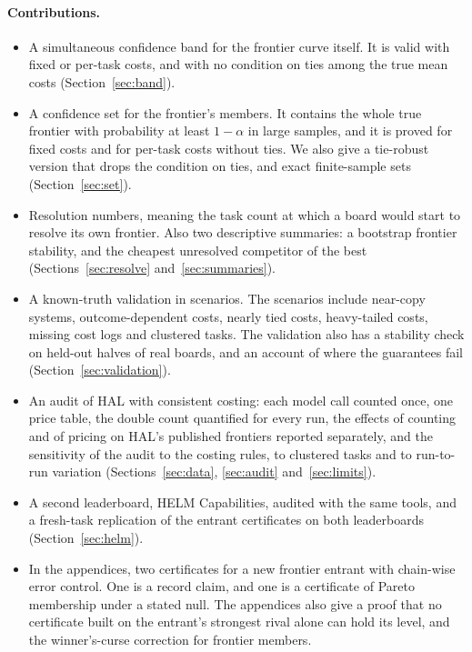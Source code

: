 \documentclass[11pt]{article}
\begin{document}
\paragraph{Contributions.}
\begin{itemize}
\item A simultaneous confidence band for the frontier curve itself. It is valid with fixed or per-task costs, and with no condition on ties among the true mean costs (Section~\ref{sec:band}).
\item A confidence set for the frontier's members. It contains the whole true frontier with probability at least $1-\alpha$ in large samples, and it is proved for fixed costs and for per-task costs without ties. We also give a tie-robust version that drops the condition on ties, and exact finite-sample sets (Section~\ref{sec:set}).
\item Resolution numbers, meaning the task count at which a board would start to resolve its own frontier. Also two descriptive summaries: a bootstrap frontier stability, and the cheapest unresolved competitor of the best (Sections~\ref{sec:resolve} and~\ref{sec:summaries}).
\item A known-truth validation in \NumValScenarios{} scenarios. The scenarios include near-copy systems, outcome-dependent costs, nearly tied costs, heavy-tailed costs, missing cost logs and clustered tasks. The validation also has a stability check on held-out halves of real boards, and an account of where the guarantees fail (Section~\ref{sec:validation}).
\item An audit of HAL with consistent costing: each model call counted once, one price table, the double count quantified for every run, the effects of counting and of pricing on HAL's published frontiers reported separately, and the sensitivity of the audit to the costing rules, to clustered tasks and to run-to-run variation (Sections~\ref{sec:data}, \ref{sec:audit} and~\ref{sec:limits}).
\item A second leaderboard, HELM Capabilities, audited with the same tools, and a fresh-task replication of the entrant certificates on both leaderboards (Section~\ref{sec:helm}).
\item In the appendices, two certificates for a new frontier entrant with chain-wise error control. One is a record claim, and one is a certificate of Pareto membership under a stated null. The appendices also give a proof that no certificate built on the entrant's strongest rival alone can hold its level, and the winner's-curse correction for frontier members.
\end{itemize}
\end{document}
